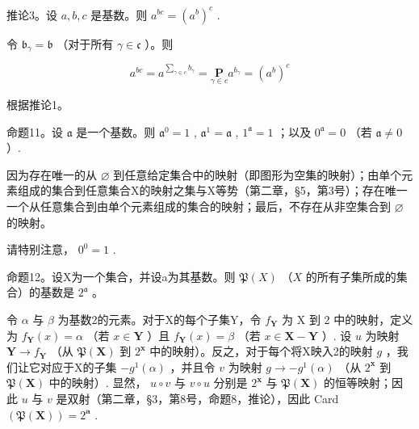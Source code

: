 推论3。设 \(a, b, c\) 是基数。则 \(a^{bc} = (a^{b})^{c}\) .

令 \(\mathfrak{b}_{\gamma} = \mathfrak{b}\) （对于所有 \(\gamma \in \mathfrak{c}\) ）。则

\[
a ^ {b c} = a ^ {\sum_ {\gamma \in c} b _ {\gamma}} = \underset {\gamma \in c} {\mathbf {P}} a ^ {b _ {\gamma}} = (a ^ {b}) ^ {c}
\]

根据推论1。

命题11。设 \(\mathfrak{a}\) 是一个基数。则 \(\mathfrak{a}^0 = 1\) , \(\mathfrak{a}^1 = \mathfrak{a}\) , \(1^{\mathfrak{a}} = 1\) ；以及 \(0^{\mathfrak{a}} = 0\) （若 \(\mathfrak{a} \neq 0\) ）.

因为存在唯一的从 \(\varnothing\) 到任意给定集合中的映射（即图形为空集的映射）；由单个元素组成的集合到任意集合X的映射之集与X等势（第二章，§5，第3号）；存在唯一一个从任意集合到由单个元素组成的集合的映射；最后，不存在从非空集合到 \(\varnothing\) 的映射。

请特别注意， \(0^{0}=1\) .

命题12。设X为一个集合，并设a为其基数。则 \(\mathfrak{P}(X)\) （\(X\) 的所有子集所成的集合）的基数是 \(2^{\mathfrak{a}}\) 。

令 \(\alpha\) 与 \(\beta\) 为基数2的元素。对于X的每个子集Y，令 \(f_{\mathbf{Y}}\) 为 X 到 2 中的映射，定义为 \(f_{\mathbf{Y}}(x) = \alpha\) （若 \(x \in \mathbf{Y}\) ）且 \(f_{\mathbf{Y}}(x) = \beta\) （若 \(x \in \mathbf{X} - \mathbf{Y}\) ）. 设 \(u\) 为映射 \(\mathbf{Y} \to f_{\mathbf{Y}}\) （从 \(\mathfrak{P}(\mathbf{X})\) 到 \(2^{\mathbf{x}}\) 中的映射）。反之，对于每个将X映入2的映射 \(g\) ，我们让它对应于X的子集 \(-g^{1}(\alpha)\) ，并且令 \(v\) 为映射 \(g \to -g^{1}(\alpha)\) （从 \(2^{\mathbf{x}}\) 到 \(\mathfrak{P}(\mathbf{X})\) 中的映射）. 显然， \(u \circ v\) 与 \(v \circ u\) 分别是 \(2^{\mathbf{x}}\) 与 \(\mathfrak{P}(\mathbf{X})\) 的恒等映射；因此 \(u\) 与 \(v\) 是双射（第二章，§3，第8号，命题8，推论），因此 Card \((\mathfrak{P}(\mathbf{X})) = 2^{\mathbf{a}}\) .

